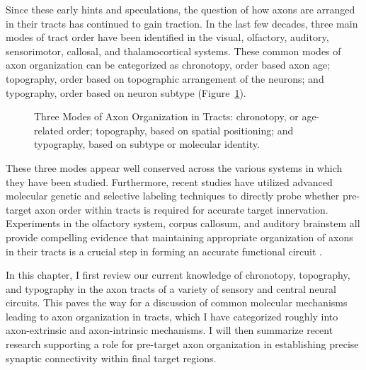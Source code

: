 Since these early hints and speculations, the question of how axons are arranged in their tracts has continued to gain traction. 
In the last few decades, three main modes of tract order have been identified in the visual, olfactory, auditory, sensorimotor, callosal, and thalamocortical systems.
These common modes of axon organization can be categorized as chronotopy, order based axon age; topography, order based on topographic arrangement of the neurons; and typography, order based on neuron subtype (Figure~\ref{AxonOrg_ThreeModes}).
\begin{figure}[hbtp]
	\makebox[\textwidth]{\framebox[5cm]{\rule{0pt}{5cm}}}
	\caption[Three Modes of Axon Organization in Tracts]{Three Modes of Axon Organization in Tracts: chronotopy, or age-related order; topography, based on spatial positioning; and typography, based on subtype or molecular identity. \label{AxonOrg_ThreeModes}}
	\end{figure}
These three modes appear well conserved across the various systems in which they have been studied.
Furthermore, recent studies have utilized advanced molecular genetic and selective labeling techniques to directly probe whether pre-target axon order within tracts is required for accurate target innervation.
Experiments in the olfactory system, corpus callosum, and auditory brainstem all provide compelling evidence that maintaining appropriate organization of axons in their tracts is a crucial step in forming an accurate functional circuit \cite{imai2009pre,zhou2013axon,michalski2013robo3}.

In this chapter, I first review our current knowledge of chronotopy, topography, and typography in the axon tracts of a variety of sensory and central neural circuits.
This paves the way for a discussion of common molecular mechanisms leading to axon organization in tracts, which I have categorized roughly into axon-extrinsic and axon-intrinsic mechanisms.
I will then summarize recent research supporting a role for pre-target axon organization in establishing precise synaptic connectivity within final target regions.